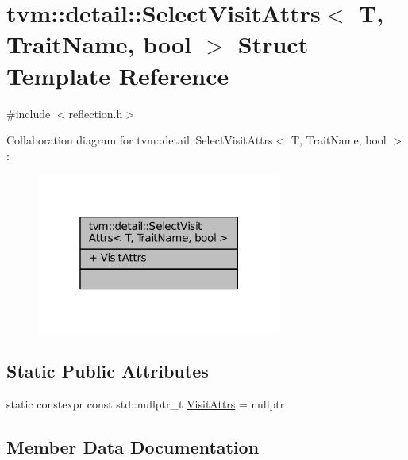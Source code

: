 \hypertarget{structtvm_1_1detail_1_1SelectVisitAttrs}{}\section{tvm\+:\+:detail\+:\+:Select\+Visit\+Attrs$<$ T, Trait\+Name, bool $>$ Struct Template Reference}
\label{structtvm_1_1detail_1_1SelectVisitAttrs}


{\ttfamily \#include $<$reflection.\+h$>$}



Collaboration diagram for tvm\+:\+:detail\+:\+:Select\+Visit\+Attrs$<$ T, Trait\+Name, bool $>$\+:
\nopagebreak
\begin{figure}[H]
\begin{center}
\leavevmode
\includegraphics[width=229pt]{structtvm_1_1detail_1_1SelectVisitAttrs__coll__graph}
\end{center}
\end{figure}
\subsection*{Static Public Attributes}
\begin{DoxyCompactItemize}
\item 
static constexpr const std\+::nullptr\+\_\+t \hyperlink{structtvm_1_1detail_1_1SelectVisitAttrs_aacd15172d6c63d2008e1d109530d174f}{Visit\+Attrs} = nullptr
\end{DoxyCompactItemize}


\subsection{Member Data Documentation}

